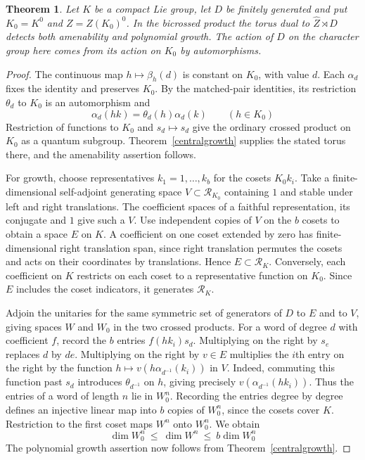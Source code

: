 \documentclass[11pt,a4paper]{article}
\newtheorem{thm}{Theorem}[section]
\theoremstyle{remark}
\begin{document}
\begin{thm}\label{finitecomponents}
Let $K$ be a compact Lie group, let $D$ be finitely generated and put
$K_0=K^0$ and $Z=Z(K_0)^0$. In the bicrossed product the torus dual to
$\widehat Z\rtimes D$ detects both amenability and polynomial
growth. The action of $D$ on the character group here comes from its
action on $K_0$ by automorphisms.
\end{thm}
\begin{proof}
The continuous map $h\mapsto\beta_h(d)$ is constant on $K_0$, with
value $d$. Each $\alpha_d$ fixes the identity and preserves $K_0$.
By the matched-pair identities, its restriction $\theta_d$ to $K_0$ is an
automorphism and
\[
 \alpha_d(hk)=\theta_d(h)\alpha_d(k)\qquad(h\in K_0)
\]
Restriction of functions to $K_0$ and $s_d\mapsto s_d$ give the ordinary
crossed product on $K_0$ as a quantum subgroup. Theorem~\ref{centralgrowth}
supplies the stated torus there, and the amenability assertion follows.

For growth, choose representatives $k_1=1,\ldots,k_b$ for the cosets
$K_0k_i$. Take a finite-dimensional self-adjoint generating space
$V\subset\mathcal R_{K_0}$ containing $1$ and stable under left
and right translations. The coefficient spaces of a faithful
representation, its conjugate and $1$ give such a $V$. Use independent
copies of $V$ on the $b$ cosets to obtain a space $E$ on $K$. A
coefficient on one coset extended by zero has finite-dimensional right
translation span, since right translation permutes the cosets and acts
on their coordinates by translations. Hence $E\subset\mathcal R_K$.
Conversely, each coefficient on $K$ restricts on each coset to a
representative function on $K_0$. Since $E$ includes the coset
indicators, it generates $\mathcal R_K$.

Adjoin the unitaries for the same symmetric set of generators of $D$ to
$E$ and to $V$, giving spaces $W$ and $W_0$ in the two crossed products.
For a word of degree $d$ with coefficient $f$, record the $b$ entries
$f(hk_i)s_d$. Multiplying on the right by $s_e$ replaces $d$ by $de$.
Multiplying on the right by $v\in E$ multiplies the $i$th entry on the
right by the function $h\mapsto v(h\alpha_{d^{-1}}(k_i))$ in $V$.
Indeed, commuting this function past $s_d$ introduces $\theta_{d^{-1}}$
on $h$, giving precisely $v(\alpha_{d^{-1}}(hk_i))$. Thus the entries
of a word of length $n$ lie in $W_0^n$. Recording the entries degree by degree defines an injective linear map
into $b$ copies of $W_0^n$, since the cosets cover $K$. Restriction to the
first coset maps $W^n$ onto $W_0^n$. We obtain
\[
 \dim W_0^n\ \le\ \dim W^n\ \le\ b\dim W_0^n
\]
The polynomial growth assertion now follows from Theorem~\ref{centralgrowth}.
\end{proof}
\end{document}

